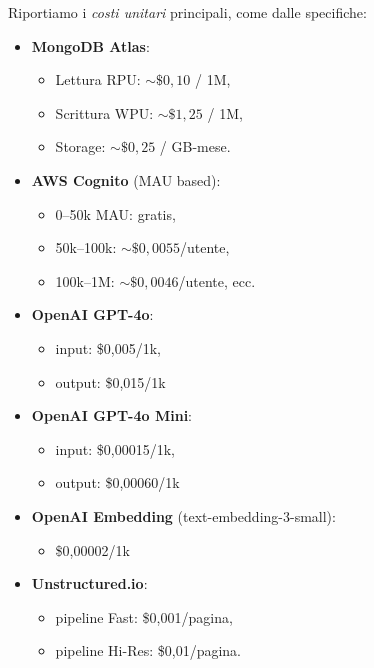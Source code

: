 \documentclass[a4paper,10pt]{article}
\begin{document}
Riportiamo i \emph{costi unitari} principali, come dalle specifiche:
\begin{itemize}
    \item \textbf{MongoDB Atlas}:
    \begin{itemize}
        \item Lettura RPU: \(\sim\$0,10\) / 1M,
        \item Scrittura WPU: \(\sim\$1,25\) / 1M,
        \item Storage: \(\sim\$0,25\) / GB-mese.
    \end{itemize}

    \item \textbf{AWS Cognito} (MAU based):
    \begin{itemize}
        \item 0--50k MAU: gratis,
        \item 50k--100k: \(\sim\$0,0055\)/utente,
        \item 100k--1M: \(\sim\$0,0046\)/utente, ecc.
    \end{itemize}

    \item \textbf{OpenAI GPT-4o}:
    \begin{itemize}
        \item input: \$0,005/1k,
        \item output: \$0,015/1k
    \end{itemize}

    \item \textbf{OpenAI GPT-4o Mini}:
    \begin{itemize}
        \item input: \$0,00015/1k,
        \item output: \$0,00060/1k
    \end{itemize}

    \item \textbf{OpenAI Embedding} (text-embedding-3-small):
    \begin{itemize}
        \item \$0,00002/1k
    \end{itemize}

    \item \textbf{Unstructured.io}:
    \begin{itemize}
        \item pipeline Fast: \$0,001/pagina,
        \item pipeline Hi-Res: \$0,01/pagina.
    \end{itemize}
\end{itemize}
\end{document}
